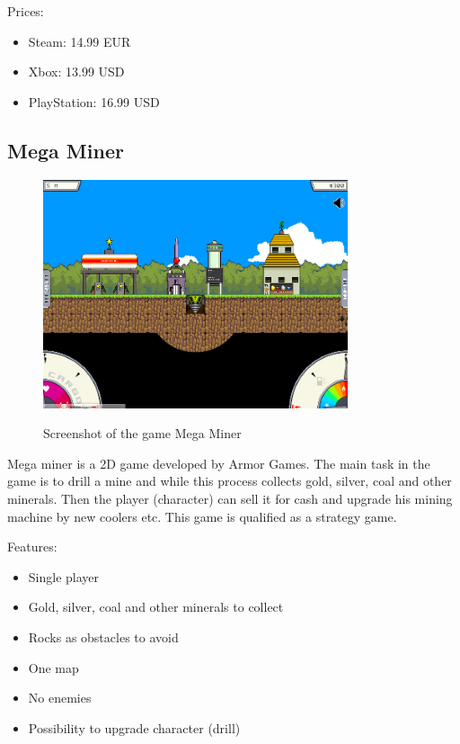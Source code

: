 \documentclass[12p]{article}
\begin{document}
Prices:

\begin{itemize}
  \item Steam: 14.99 EUR
  \item Xbox: 13.99 USD
  \item PlayStation: 16.99 USD
\end{itemize}


\subsection{Mega Miner}

\begin{figure}[ht]
  \center
  \includegraphics[width=0.8\textwidth]{StateOfTheArtScreenshots/mega_miner}
  \label{StateOfTheArt_Screenshots_MegaMiner}
  \caption{Screenshot of the game Mega Miner \cite{MegaMinerScreenshot}}
\end{figure}

Mega miner is a 2D game developed by Armor Games. The main task in the game is to drill a mine and while this process collects gold, silver, coal and other minerals. Then the player (character) can sell it for cash and upgrade his mining machine by new coolers etc. This game is qualified as a strategy game.

Features:

\begin{itemize}
  \item Single player
  \item Gold, silver, coal and other minerals to collect
  \item Rocks as obstacles to avoid
  \item One map
  \item No enemies
  \item Possibility to upgrade character (drill)
\end{itemize}
\end{document}
